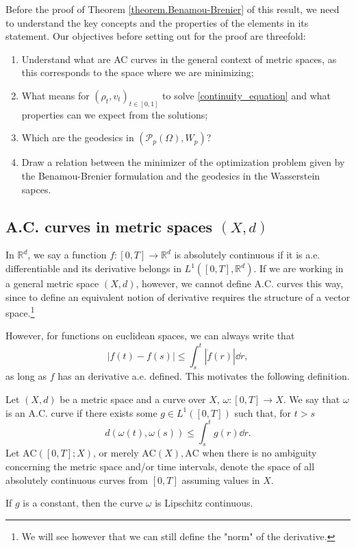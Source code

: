 Before the proof of Theorem \eqref{theorem.Benamou-Brenier} of this result, we need to understand the key concepts and the properties of the elements in its statement. Our objectives before setting out for the proof are threefold:
\begin{enumerate}
	\item Understand what are AC curves in the general context of metric spaces, as this corresponds to the space where we are minimizing; 
	\item What means for $(\rho_t, v_t)_{t \in [0,1]}$ to solve \eqref{continuity_equation} and what properties can we expect from the solutions;
	\item Which are the geodesics in $(\mathcal{P}_p(\Omega), W_p)$? 
	\item Draw a relation between the minimizer of the optimization problem given by the Benamou-Brenier formulation and the geodesics in the Wasserstein sapces. 
\end{enumerate} 

\subsection{A.C. curves in metric spaces $(X,d)$} 
In $\mathbb{R}^d$, we say a function $f:[0,T] \to \mathbb{R}^d$ is absolutely continuous if it is a.e. differentiable and its derivative belongs in $L^1\left([0,T], \mathbb{R}^d\right)$. If we are working in a general metric space $(X,d)$, however, we cannot define A.C. curves this way, since to define an equivalent notion of derivative requires the structure of a vector space.\footnote{We will see however that we can still define the "norm" of the derivative.}

However, for functions on euclidean spaces, we can always write that 
\begin{equation*}
|f(t) - f(s)| \le \int_s^t |\dot{f}(r)|\dd r,
\end{equation*} 
as long as $f$ has an derivative a.e. defined. This motivates the following definition. 

\begin{definition}
	Let $(X,d)$ be a metric space and a curve over $X$, $\omega : [0,T] \to X$. We say that $\omega$ is an A.C. curve if there exists some $g \in L^1([0,T])$ such that, for $t > s$
	\begin{equation*}
	d\left(\omega(t), \omega(s)\right) \le \int_s^t g(r)\dd r.
	\end{equation*}
	Let $\text{AC}([0,T];X)$, or merely $\text{AC}(X), \text{AC}$ when there is no ambiguity concerning the metric space and/or time intervals, denote the space of all absolutely continuous curves from $[0,T]$ assuming values in $X$.  
\end{definition}
\begin{remark}
	If $g$ is a constant, then the curve $\omega$ is Lipschitz continuous. 
\end{remark}

